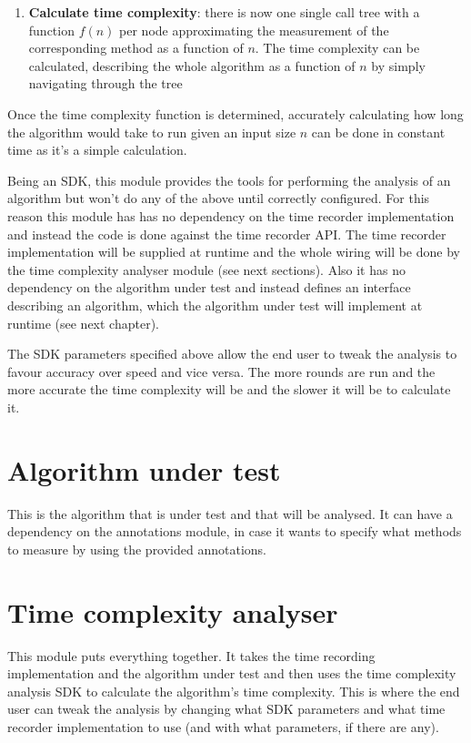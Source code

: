 \begin{enumerate}
  \item \textbf{Calculate time complexity}: there is now one single call tree with a function $f(n)$ per node approximating the measurement of the corresponding method as a function of $n$. The time complexity can be calculated, describing the whole algorithm as a function of $n$ by simply navigating through the tree
\end{enumerate}

\noindent Once the time complexity function is determined, accurately calculating how long the algorithm would take to run given an input size $n$ can be done in constant time as it's a simple calculation.

\noindent Being an SDK, this module provides the tools for performing the analysis of an algorithm but won't do any of the above until correctly configured. For this reason this module has  has no dependency on the time recorder implementation and instead the code is done against the time recorder API. The time recorder implementation will be supplied at runtime and the whole wiring will be done by the time complexity analyser module (see next sections). Also it has no dependency on the algorithm under test and instead defines an interface describing an algorithm, which the algorithm under test will implement at runtime (see next chapter).

\noindent The SDK parameters specified above allow the end user to tweak the analysis to favour accuracy over speed and vice versa. The more rounds are run and the more accurate the time complexity will be and the slower it will be to calculate it.

\section{Algorithm under test}
This is the algorithm that is under test and that will be analysed. It can have a dependency on the annotations module, in case it wants to specify what methods to measure by using the provided annotations.

\section{Time complexity analyser}
\label{sec:design:timecomplexityanalyser}
This module puts everything together. It takes the time recording implementation and the algorithm under test and then uses the time complexity analysis SDK to calculate the algorithm's time complexity. This is where the end user can tweak the analysis by changing what SDK parameters and what time recorder implementation to use (and with what parameters, if there are any).